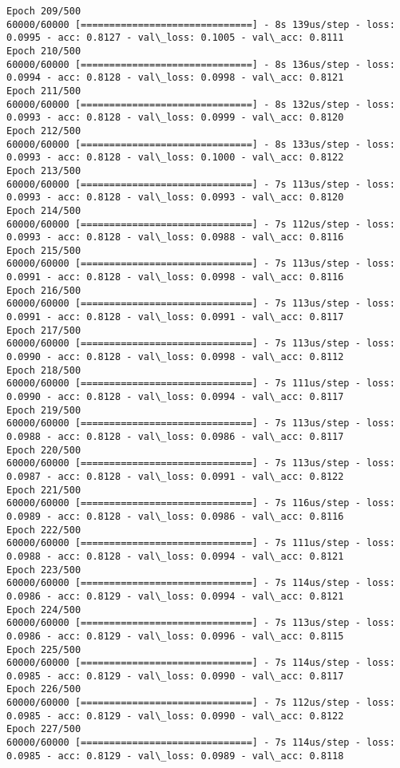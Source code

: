 \documentclass[11pt]{article}
\begin{document}
\begin{Verbatim}[commandchars=\\\{\}]
Epoch 209/500
60000/60000 [==============================] - 8s 139us/step - loss: 0.0995 - acc: 0.8127 - val\_loss: 0.1005 - val\_acc: 0.8111
Epoch 210/500
60000/60000 [==============================] - 8s 136us/step - loss: 0.0994 - acc: 0.8128 - val\_loss: 0.0998 - val\_acc: 0.8121
Epoch 211/500
60000/60000 [==============================] - 8s 132us/step - loss: 0.0993 - acc: 0.8128 - val\_loss: 0.0999 - val\_acc: 0.8120
Epoch 212/500
60000/60000 [==============================] - 8s 133us/step - loss: 0.0993 - acc: 0.8128 - val\_loss: 0.1000 - val\_acc: 0.8122
Epoch 213/500
60000/60000 [==============================] - 7s 113us/step - loss: 0.0993 - acc: 0.8128 - val\_loss: 0.0993 - val\_acc: 0.8120
Epoch 214/500
60000/60000 [==============================] - 7s 112us/step - loss: 0.0993 - acc: 0.8128 - val\_loss: 0.0988 - val\_acc: 0.8116
Epoch 215/500
60000/60000 [==============================] - 7s 113us/step - loss: 0.0991 - acc: 0.8128 - val\_loss: 0.0998 - val\_acc: 0.8116
Epoch 216/500
60000/60000 [==============================] - 7s 113us/step - loss: 0.0991 - acc: 0.8128 - val\_loss: 0.0991 - val\_acc: 0.8117
Epoch 217/500
60000/60000 [==============================] - 7s 113us/step - loss: 0.0990 - acc: 0.8128 - val\_loss: 0.0998 - val\_acc: 0.8112
Epoch 218/500
60000/60000 [==============================] - 7s 111us/step - loss: 0.0990 - acc: 0.8128 - val\_loss: 0.0994 - val\_acc: 0.8117
Epoch 219/500
60000/60000 [==============================] - 7s 113us/step - loss: 0.0988 - acc: 0.8128 - val\_loss: 0.0986 - val\_acc: 0.8117
Epoch 220/500
60000/60000 [==============================] - 7s 113us/step - loss: 0.0987 - acc: 0.8128 - val\_loss: 0.0991 - val\_acc: 0.8122
Epoch 221/500
60000/60000 [==============================] - 7s 116us/step - loss: 0.0989 - acc: 0.8128 - val\_loss: 0.0986 - val\_acc: 0.8116
Epoch 222/500
60000/60000 [==============================] - 7s 111us/step - loss: 0.0988 - acc: 0.8128 - val\_loss: 0.0994 - val\_acc: 0.8121
Epoch 223/500
60000/60000 [==============================] - 7s 114us/step - loss: 0.0986 - acc: 0.8129 - val\_loss: 0.0994 - val\_acc: 0.8121
Epoch 224/500
60000/60000 [==============================] - 7s 113us/step - loss: 0.0986 - acc: 0.8129 - val\_loss: 0.0996 - val\_acc: 0.8115
Epoch 225/500
60000/60000 [==============================] - 7s 114us/step - loss: 0.0985 - acc: 0.8129 - val\_loss: 0.0990 - val\_acc: 0.8117
Epoch 226/500
60000/60000 [==============================] - 7s 112us/step - loss: 0.0985 - acc: 0.8129 - val\_loss: 0.0990 - val\_acc: 0.8122
Epoch 227/500
60000/60000 [==============================] - 7s 114us/step - loss: 0.0985 - acc: 0.8129 - val\_loss: 0.0989 - val\_acc: 0.8118

\end{Verbatim}
\end{document}
